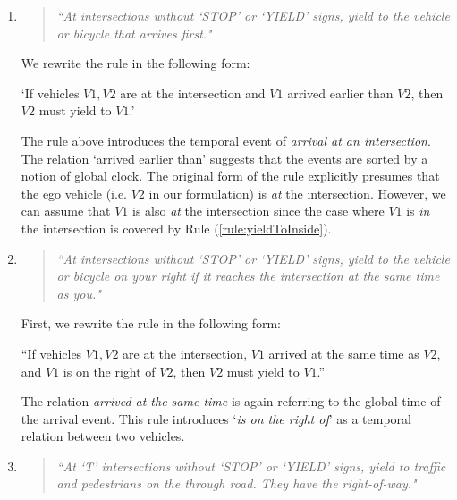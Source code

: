 \begin{enumerate}
\item \label{rule:FIFO}
\begin{quote}
{\em ``At intersections without `STOP' or `YIELD' signs,
yield to the vehicle or bicycle that arrives first."
\cite[p. 36]{DMV-California.2019}}
\end{quote}

We rewrite the rule in the following form:
\begin{center}
`If vehicles $V1, V2$ are at the intersection and
$V1$ arrived earlier than $V2$,
then $V2$ must yield to $V1$.'
\end{center}

The rule above introduces the temporal event of \emph{arrival at an intersection}.
The relation `arrived earlier than' suggests that
the events are sorted by a notion of global clock.
The original form of the rule explicitly presumes that
the ego vehicle (i.e. $V2$ in our formulation)
is \emph{at} the intersection.
However,
we can assume that $V1$ is also \emph{at} the intersection since
the case where $V1$ is \emph{in} the intersection is covered by Rule (\ref{rule:yieldToInside}).
\item \label{rule:yieldToRight}
\begin{quote}
{\em ``At intersections without `STOP' or `YIELD' signs,
yield to the vehicle or bicycle on your right if it reaches the intersection at the same time as you."
\cite[p. 36]{DMV-California.2019}}
\end{quote}

First, we rewrite the rule in the following form:
\begin{center}
``If vehicles $V1, V2$ are at the intersection,
$V1$ arrived at the same time as $V2$, and
$V1$ is on the right of $V2$,
then $V2$ must yield to $V1$.''
\end{center}

The relation \emph{arrived at the same time} is again referring
to the global time of the arrival event.
This rule introduces `\emph{is on the right of}' as a temporal relation between two vehicles.

\item \label{rule:T-intersection}
\begin{quote}
{\em ``At `T' intersections without `STOP' or `YIELD' signs,
yield to traffic and pedestrians on the through road.
They have the right-of-way."
\cite[p. 35]{DMV-California.2019}}
\end{quote}


\end{enumerate}
